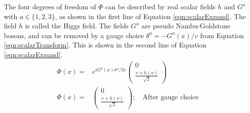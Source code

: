 The four degrees of freedom of $\Phi$ can be described by real scalar fields $h$ and $G^a$ with $a\in\{1,2,3\}$, as shown in the first line of Equation \ref{eqn:scalarExpand}.
The field $h$ is called the Higgs field.
The fields $G^a$ are pseudo Nambu-Goldstone bosons, and can be removed by a gauge choice $\theta^a=-G^a(x)/v$ from Equation \ref{eqn:scalarTransform}.
This is shown in the second line of Equation \ref{eqn:scalarExpand}.
\begin{equation}\begin{split}\label{eqn:scalarExpand}
\Phi(x)=&e^{iG^a(x)\sigma^a/2v}\begin{pmatrix}0\\\frac{v+h(x)}{\sqrt{2}}\end{pmatrix} \\
\Phi(x)=&\begin{pmatrix}0\\\frac{v+h(x)}{\sqrt{2}}\end{pmatrix}; \quad\text{After gauge choice} \\
\end{split}\end{equation} 

